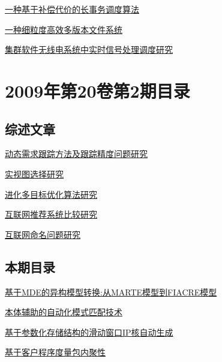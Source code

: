 \documentclass[a4paper]{article}
\begin{document}
\href{http://www.jos.org.cn/ch/reader/download_pdf.aspx?file_no=3475&year_id=2009&quarter_id=3&falg=1}{一种基于补偿代价的长事务调度算法}

\href{http://www.jos.org.cn/ch/reader/download_pdf.aspx?file_no=3182&year_id=2009&quarter_id=3&falg=1}{一种细粒度高效多版本文件系统}

\href{http://www.jos.org.cn/ch/reader/download_pdf.aspx?file_no=3313&year_id=2009&quarter_id=3&falg=1}{集群软件无线电系统中实时信号处理调度研究}


\section{\textbf{2009年第20卷第2期目录}}
\subsection{综述文章}
\href{http://www.jos.org.cn/ch/reader/download_pdf.aspx?file_no=3365&year_id=2009&quarter_id=2&falg=1}{动态需求跟踪方法及跟踪精度问题研究}

\href{http://www.jos.org.cn/ch/reader/download_pdf.aspx?file_no=3416&year_id=2009&quarter_id=2&falg=1}{实视图选择研究}

\href{http://www.jos.org.cn/ch/reader/download_pdf.aspx?file_no=3483&year_id=2009&quarter_id=2&falg=1}{进化多目标优化算法研究}

\href{http://www.jos.org.cn/ch/reader/download_pdf.aspx?file_no=3388&year_id=2009&quarter_id=2&falg=1}{互联网推荐系统比较研究}

\href{http://www.jos.org.cn/ch/reader/download_pdf.aspx?file_no=3389&year_id=2009&quarter_id=2&falg=1}{互联网命名问题研究}

\subsection{本期目录}
\href{http://www.jos.org.cn/ch/reader/download_pdf.aspx?file_no=3423&year_id=2009&quarter_id=2&falg=1}{基于MDE的异构模型转换:从MARTE模型到FIACRE模型}

\href{http://www.jos.org.cn/ch/reader/download_pdf.aspx?file_no=3271&year_id=2009&quarter_id=2&falg=1}{本体辅助的自动化模式匹配技术}

\href{http://www.jos.org.cn/ch/reader/download_pdf.aspx?file_no=3296&year_id=2009&quarter_id=2&falg=1}{基于参数化存储结构的滑动窗口IP核自动生成}

\href{http://www.jos.org.cn/ch/reader/download_pdf.aspx?file_no=561&year_id=2009&quarter_id=2&falg=1}{基于客户程序度量包内聚性}
\end{document}
